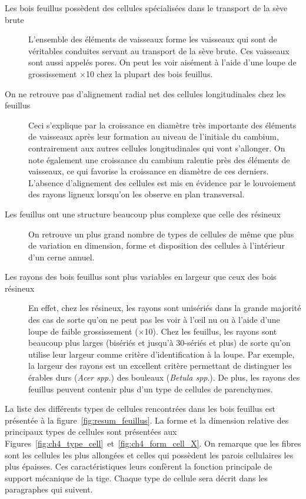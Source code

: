 \begin{description}

\item[Les bois feuillus possèdent des cellules spécialisées dans le transport de la sève brute] L'ensemble des éléments de vaisseaux forme les vaisseaux qui sont de véritables conduites servant au transport de la sève brute. Ces vaisseaux sont aussi appelés pores. On peut les voir aisément à l'aide d'une loupe de grossissement $\times$10 chez la plupart des bois feuillus.\\

\item[On ne retrouve pas d'alignement radial net des cellules longitudinales chez les feuillus] Ceci s'explique par la croissance en diamètre très importante des éléments de vaisseaux après leur formation au niveau de l'initiale du cambium, contrairement aux autres cellules longitudinales qui vont s'allonger.  On note également une croissance du cambium ralentie près des éléments de vaisseaux, ce qui favorise la croissance en diamètre de ces derniers. L'absence d'alignement des cellules est mis en évidence par le louvoiement des rayons ligneux lorsqu'on les observe en plan transversal.\\

\item[Les feuillus ont une structure beaucoup plus complexe que celle des résineux] On retrouve un plus grand nombre de types de cellules de même que plus de variation en dimension, forme et disposition des cellules à l'intérieur d'un cerne annuel. \\

\item[Les rayons des bois feuillus sont plus variables en largeur que ceux des bois résineux] En effet, chez les résineux, les rayons sont unisériés dans la grande majorité des cas de sorte qu'on ne peut pas les voir à l'œil nu ou à l'aide d'une loupe de faible grossissement ($\times$10).  Chez les feuillus, les rayons sont beaucoup plus larges (bisériés et jusqu'à 30-sériés et plus) de sorte qu'on utilise leur largeur comme critère d'identification à la loupe. Par exemple, la largeur des rayons est un excellent critère permettant de distinguer les érables durs (\textit{Acer spp.}) des bouleaux (\textit{Betula spp}.). De plus, les rayons des feuillus peuvent contenir plus d'un type de cellules de parenchymes.\\
\end{description}

La liste des différents types de cellules rencontrées dans les bois feuillus est présentée à la figure~\ref{fig:resum_feuillus}. La forme et la dimension relative des principaux types de cellules sont présentées aux Figures~\ref{fig:ch4_type_cell}~et~\ref{fig:ch4_form_cell_X}.  On remarque que les fibres sont les cellules les plus allongées et celles qui possèdent les parois cellulaires les plus épaisses. Ces caractéristiques leurs confèrent la fonction principale de support mécanique de la tige. Chaque type de cellule sera décrit dans les paragraphes qui suivent.

